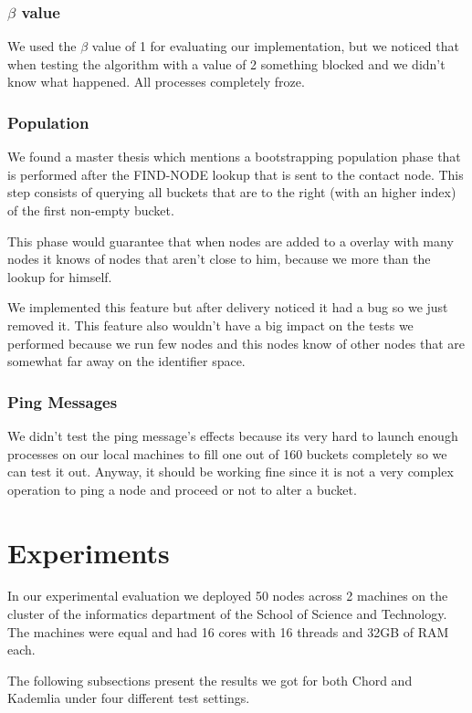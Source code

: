 \documentclass[sigconf]{acmart}
\begin{document}
\subsubsection{$\beta$ value}
We used the $\beta$ value of 1 for evaluating our implementation, but we noticed that when testing the algorithm with a value of 2 something blocked and we didn't know what happened. All processes completely froze.

\subsubsection{Population}
We found a master thesis which mentions a bootstrapping population phase that is performed after the FIND-NODE lookup that is sent to the contact node. This step consists of querying all buckets that are to the right (with an higher index) of the first non-empty bucket.


This phase would guarantee that when nodes are added to a overlay with many nodes it knows of nodes that aren't close to him, because we more than the lookup for himself.

We implemented this feature but after delivery noticed it had a bug so we just removed it. This feature also wouldn't have a big impact on the tests we performed because we run few nodes and this nodes know of other nodes that are somewhat far away on the identifier space.


\subsubsection{Ping Messages}
We didn't test the ping message's effects because its very hard to launch enough processes on our local machines to fill one out of 160 buckets completely so we can test it out. Anyway, it should be working fine since it is not a very complex operation to ping a node and proceed or not to alter a bucket.


\section{Experiments}
In our experimental evaluation we deployed 50 nodes across 2 machines on the cluster of the informatics department of the School of Science and Technology. The machines were equal and had 16 cores with 16 threads and 32GB of RAM each.

The following subsections present the results we got for both Chord and Kademlia under four different test settings.
\end{document}
